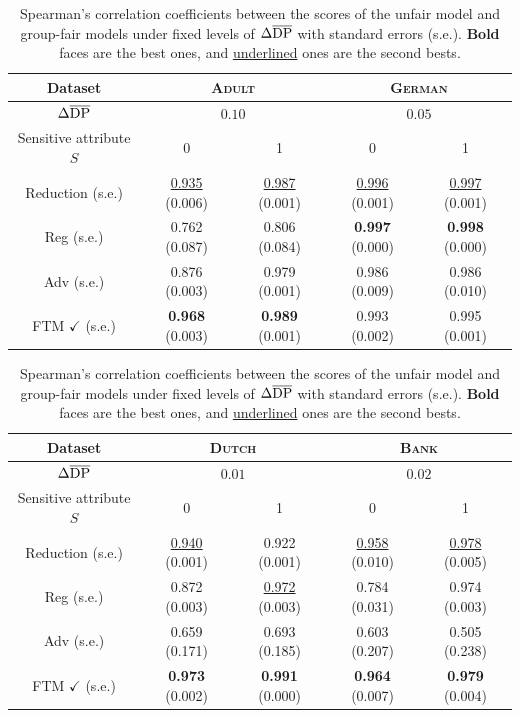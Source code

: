 \documentclass[10pt]{article} %
\begin{document}
\begin{table}[h]
    \centering
    \scriptsize
    \caption{
    Spearman's correlation coefficients between the scores of the unfair model and group-fair models under fixed levels of $\Delta \overline{\textup{DP}}$ with standard errors (s.e.).
    \textbf{Bold} faces are the best ones, and \underline{underlined} ones are the second bests.
    }
    \label{table:interpret}
    \vskip 0.1in
    \begin{tabular}{c||c|c|c|c}
        \toprule
        Dataset & \multicolumn{2}{c|}{\textsc{Adult}} & \multicolumn{2}{c}{\textsc{German}} 
        \\
        \midrule
        $\Delta \overline{\textup{DP}}$  & \multicolumn{2}{c|}{$0.10$} & \multicolumn{2}{c}{$0.05$} 
        \\
        \midrule
        \midrule
        Sensitive attribute $S$ & 0 & 1 & 0 & 1 
        \\
        \midrule
        Reduction (s.e.) & \underline{0.935} (0.006) & \underline{0.987} (0.001) & \underline{0.996} (0.001) & \underline{0.997} (0.001) 
        \\
        Reg (s.e.) & 0.762 (0.087) & 0.806 (0.084) & \textbf{0.997} (0.000) & \textbf{0.998} (0.000) 
        \\
        Adv (s.e.) & 0.876 (0.003) & 0.979 (0.001) & 0.986 (0.009) & 0.986 (0.010) 
        \\
        FTM $\checkmark$ (s.e.) & \textbf{0.968} (0.003) & \textbf{0.989} (0.001) & 0.993 (0.002) & 0.995 (0.001) 
        \\
        \bottomrule
    \end{tabular}
    \begin{tabular}{c||c|c|c|c}
        \toprule
        Dataset & \multicolumn{2}{c|}{\textsc{Dutch}} & \multicolumn{2}{c}{\textsc{Bank}} 
        \\
        \midrule
        $\Delta \overline{\textup{DP}}$  & \multicolumn{2}{c|}{$0.01$} & \multicolumn{2}{c}{$0.02$} 
        \\
        \midrule
        \midrule
        Sensitive attribute $S$ & 0 & 1 & 0 & 1
        \\
        \midrule
        Reduction (s.e.) & \underline{0.940} (0.001) & 0.922 (0.001) & \underline{0.958} (0.010) & \underline{0.978} (0.005)
        \\
        Reg (s.e.) & 0.872 (0.003) & \underline{0.972} (0.003) & 0.784 (0.031) & 0.974 (0.003)
        \\
        Adv (s.e.) & 0.659 (0.171) & 0.693 (0.185) & 0.603 (0.207) & 0.505 (0.238)
        \\
        FTM $\checkmark$ (s.e.) & \textbf{0.973} (0.002) & \textbf{0.991} (0.000) & \textbf{0.964} (0.007) & \textbf{0.979} (0.004)
        \\
        \bottomrule
    \end{tabular}
\end{table}
\end{document}

